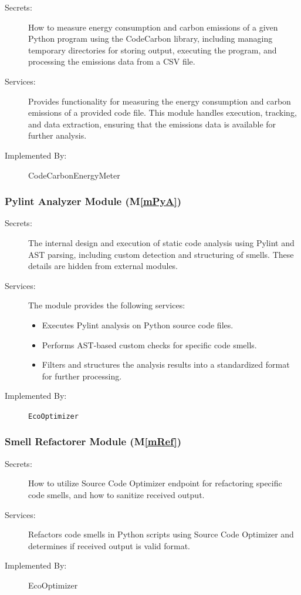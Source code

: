 \documentclass[12pt, titlepage]{article}
\newcommand{\mref}[1]{M\ref{#1}}
\begin{document}
\begin{description}
\item[Secrets:] How to measure energy consumption and carbon emissions of a given Python program using the CodeCarbon library, including managing temporary directories for storing output, executing the program, and processing the emissions data from a CSV file.
\item[Services:] Provides functionality for measuring the energy consumption and carbon emissions of a provided code file. This module handles execution, tracking, and data extraction, ensuring that the emissions data is available for further analysis.
\item[Implemented By:] CodeCarbonEnergyMeter
\end{description}

\subsubsection{Pylint Analyzer Module (\mref{mPyA})}

\begin{description}
\item[Secrets:] The internal design and execution of static code analysis using Pylint and AST parsing, including custom detection and structuring of smells. These details are hidden from external modules.
\item[Services:] The module provides the following services:
  \begin{itemize}
    \item Executes Pylint analysis on Python source code files.
    \item Performs AST-based custom checks for specific code smells.
    \item Filters and structures the analysis results into a standardized format for further processing.
  \end{itemize}
\item[Implemented By:] \texttt{EcoOptimizer}
\end{description}


\subsubsection{Smell Refactorer Module (\mref{mRef})}


\begin{description}
    \item[Secrets:] How to utilize Source Code Optimizer endpoint for refactoring specific code smells, and how to sanitize received output.
    \item[Services:] Refactors code smells in Python scripts using Source Code Optimizer and determines if received output is valid format.
    \item[Implemented By:] EcoOptimizer
\end{description}
\end{document}
